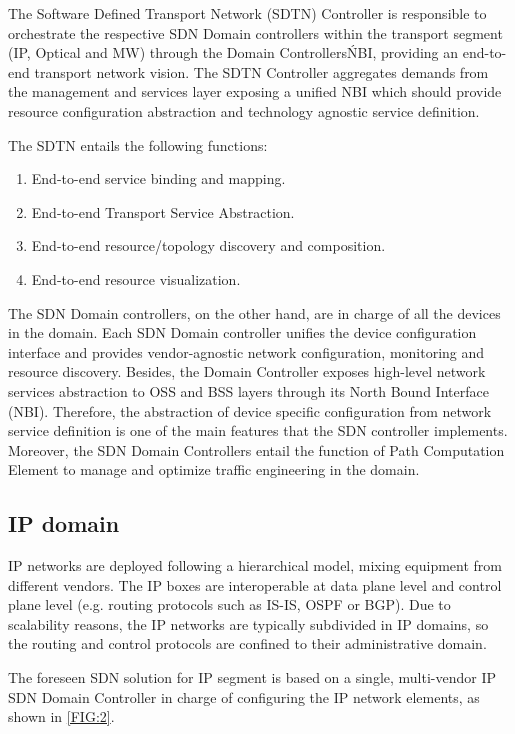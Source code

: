 \documentclass[a4paper,fleqn]{cas-dc}
\begin{document}
The Software Defined Transport Network (SDTN) Controller is responsible to orchestrate the respective SDN Domain controllers within the transport segment (IP, Optical and MW) through the Domain Controllers\'NBI, providing an end-to-end transport network vision. The SDTN Controller aggregates demands from the management and services layer exposing a unified NBI which should provide resource configuration abstraction and technology agnostic service definition. 

The SDTN entails the following functions: 
\begin{enumerate}
    \item End-to-end service binding and mapping.
    \item End-to-end Transport Service Abstraction.
    \item End-to-end resource/topology discovery and composition.
    \item End-to-end resource visualization.
\end{enumerate}

The SDN Domain controllers, on the other hand, are in charge of all the devices in the domain. Each SDN Domain controller unifies the device configuration interface and provides vendor-agnostic network configuration, monitoring and resource discovery. Besides, the Domain Controller exposes high-level network services abstraction to OSS and BSS layers through its North Bound Interface (NBI). Therefore, the abstraction of device specific configuration from network service definition is one of the main features that the SDN controller implements. Moreover, the SDN Domain Controllers entail the function of Path Computation Element to manage and optimize traffic engineering in the domain.

\subsection {IP domain}
\label{section:ip}
IP networks are deployed following a hierarchical model, mixing equipment from different vendors. The IP boxes are interoperable at data plane level and control plane level (e.g. routing protocols such as IS-IS, OSPF or BGP). Due to scalability reasons, the IP networks are typically subdivided in IP domains, so the routing and control protocols are confined to their administrative domain.

The foreseen SDN solution for IP segment is based on a single, multi-vendor IP SDN Domain Controller in charge of configuring the IP network elements, as shown in \cref{FIG:2}.
\end{document}
